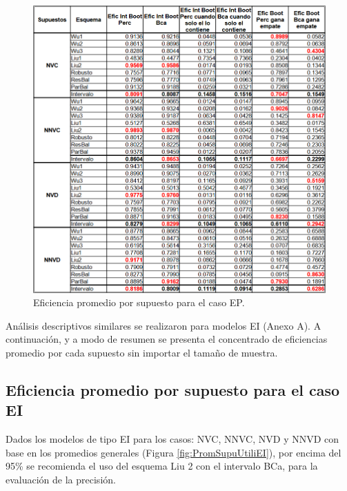 \begin{figure}[ht] 
	\centering 
	\includegraphics[width=0.80\linewidth]{img/EP_Prom_Supuestos.png} 
	\caption{Eficiencia promedio por supuesto para el caso EP.} 
	\label{fig:PromSupuUtiliEP}
\end{figure}
\FloatBarrier





Análisis descriptivos similares se realizaron para modelos EI (Anexo A). A continuación, y a modo de resumen se presenta el concentrado de eficiencias promedio por cada supuesto sin importar el tamaño de muestra.\\


\subsection{Eficiencia promedio por supuesto para el caso EI}

Dados los modelos de tipo EI para los casos: NVC, NNVC, NVD y NNVD con base en los promedios generales (Figura \ref{fig:PromSupuUtiliEI}), por encima del 95\% se recomienda el uso del esquema Liu 2 con el intervalo BCa, para la evaluación de la precisión.


